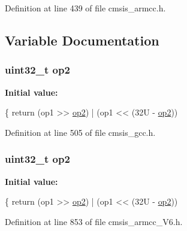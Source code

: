 Definition at line 439 of file cmsis\+\_\+armcc.\+h.



\subsection{Variable Documentation}
\subsubsection[{\texorpdfstring{op2}{op2}}]{\setlength{\rightskip}{0pt plus 5cm}uint32\+\_\+t op2}\hypertarget{group___c_m_s_i_s___core___instruction_interface_gadb2bb33809b6f35ba4d176cbec7c7b75}{}\label{group___c_m_s_i_s___core___instruction_interface_gadb2bb33809b6f35ba4d176cbec7c7b75}
{\bfseries Initial value\+:}
\begin{DoxyCode}
\{
  \textcolor{keywordflow}{return} (op1 >> \hyperlink{group___c_m_s_i_s___core___instruction_interface_gadb2bb33809b6f35ba4d176cbec7c7b75}{op2}) | (op1 << (32U - \hyperlink{group___c_m_s_i_s___core___instruction_interface_gadb2bb33809b6f35ba4d176cbec7c7b75}{op2}))
\end{DoxyCode}


Definition at line 505 of file cmsis\+\_\+gcc.\+h.

\subsubsection[{\texorpdfstring{op2}{op2}}]{\setlength{\rightskip}{0pt plus 5cm}uint32\+\_\+t op2}\hypertarget{group___c_m_s_i_s___core___instruction_interface_gadb2bb33809b6f35ba4d176cbec7c7b75}{}\label{group___c_m_s_i_s___core___instruction_interface_gadb2bb33809b6f35ba4d176cbec7c7b75}
{\bfseries Initial value\+:}
\begin{DoxyCode}
\{
  \textcolor{keywordflow}{return} (op1 >> \hyperlink{group___c_m_s_i_s___core___instruction_interface_gadb2bb33809b6f35ba4d176cbec7c7b75}{op2}) | (op1 << (32U - \hyperlink{group___c_m_s_i_s___core___instruction_interface_gadb2bb33809b6f35ba4d176cbec7c7b75}{op2}))
\end{DoxyCode}


Definition at line 853 of file cmsis\+\_\+armcc\+\_\+\+V6.\+h.

